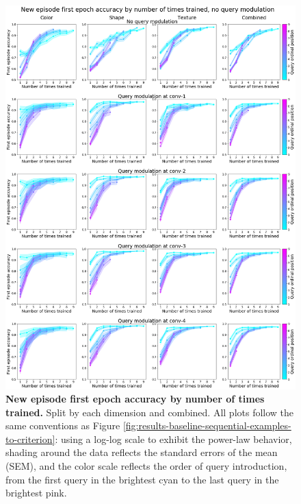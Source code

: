 \begin{figure}[!htb]
\centering
\includegraphics[width=\linewidth]{ch-results/figures/query_mod_benchmark/first_episode_accuracy_per_modualtion_level_times_trained.png}
\caption{ {\bf New episode first epoch accuracy by number of times trained.} Split by each dimension and combined. All plots follow the same conventions as Figure \ref{fig:results-baseline-sequential-examples-to-criterion}: using a log-log scale to exhibit the power-law behavior, shading around the data reflects the standard errors of the mean (SEM), and the color scale reflects the order of query introduction, from the first query in the brightest cyan to the last query in the brightest pink.}
\label{fig:results-query-mod-benchmark-first-episode-accuracy-per-modualtion-level-times-trained}
\end{figure}

